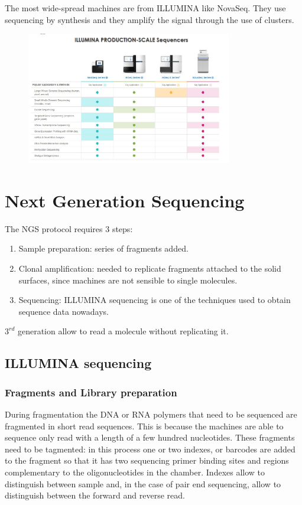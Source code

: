 The most wide-spread machines are from ILLUMINA like NovaSeq.
They use sequencing by synthesis and they amplify the signal through the use of clusters.

\begin{figure}[H]
\centering
\includegraphics[width=0.8\textwidth]{sequencingMachinesIllumina}
\caption{}
\label{}
\end{figure}

\section{Next Generation Sequencing}
The NGS protocol requires $3$ steps:

\begin{multicols}{2}
    \begin{enumerate}
          \item Sample preparation: series of fragments added.
          \item Clonal amplification: needed to replicate fragments attached to the solid surfaces, since machines are not sensible to single molecules.
          \item Sequencing: ILLUMINA sequencing is one of the techniques used to obtain sequence data nowadays.
    \end{enumerate}
\end{multicols}

$3^{rd}$ generation allow to read a molecule without replicating it.

    \subsection{ILLUMINA sequencing}

        \subsubsection{Fragments and Library preparation}
        During fragmentation the DNA or RNA polymers that need to be sequenced are fragmented in short read sequences.
        This is because the machines are able to sequence only read with a length of a few hundred nucleotides.
        These fragments need to be tagmented: in this process one or two indexes, or barcodes are added to the fragment so that it has two sequencing primer binding sites and regions complementary to the oligonucleotides in the chamber.
        Indexes allow to distinguish between sample and, in the case of pair end sequencing, allow to distinguish between the forward and reverse read.


